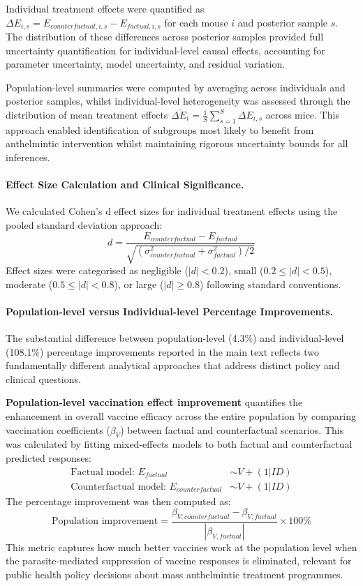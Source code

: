 \documentclass[a4paper, hidelinks, 11pt]{article}
\begin{document}
\begin{appendices}
	Individual treatment effects were quantified as $\Delta E_{i,s} = E_{counterfactual,i,s} - E_{factual,i,s}$ for each mouse $i$ and posterior sample $s$. The distribution of these differences across posterior samples provided full uncertainty quantification for individual-level causal effects, accounting for parameter uncertainty, model uncertainty, and residual variation.

	Population-level summaries were computed by averaging across individuals and posterior samples, whilst individual-level heterogeneity was assessed through the distribution of mean treatment effects $\bar{\Delta E_i} = \frac{1}{S}\sum_{s=1}^S \Delta E_{i,s}$ across mice. This approach enabled identification of subgroups most likely to benefit from anthelmintic intervention whilst maintaining rigorous uncertainty bounds for all inferences.

	\paragraph{Effect Size Calculation and Clinical Significance.} \label{supdata:EffectSizeCalculation} We calculated Cohen's d effect sizes for individual treatment effects using the pooled standard deviation approach:
	$$d = \frac{E_{counterfactual} - E_{factual}}{\sqrt{(\sigma_{counterfactual}^2 + \sigma_{factual}^2)/2}}$$
	Effect sizes were categorised as negligible ($|d| < 0.2$), small ($0.2 \leq |d| < 0.5$), moderate ($0.5 \leq |d| < 0.8$), or large ($|d| \geq 0.8$) following standard conventions.

	\paragraph{Population-level versus Individual-level Percentage Improvements.} \label{supdata:PercentageImprovements} The substantial difference between population-level (4.3\%) and individual-level (108.1\%) percentage improvements reported in the main text reflects two fundamentally different analytical approaches that address distinct policy and clinical questions.

	\textbf{Population-level vaccination effect improvement} quantifies the enhancement in overall vaccine efficacy across the entire population by comparing vaccination coefficients ($\beta_V$) between factual and counterfactual scenarios. This was calculated by fitting mixed-effects models to both factual and counterfactual predicted responses:
	\begin{align}
		\text{Factual model: } E_{factual}               & \sim V + (1|ID) \\
		\text{Counterfactual model: } E_{counterfactual} & \sim V + (1|ID)
	\end{align}
	The percentage improvement was then computed as:
	$$\text{Population improvement} = \frac{\beta_{V,counterfactual} - \beta_{V,factual}}{|\beta_{V,factual}|} \times 100\%$$
	This metric captures how much better vaccines work at the population level when the parasite-mediated suppression of vaccine responses is eliminated, relevant for public health policy decisions about mass anthelmintic treatment programmes.


\end{appendices}
\end{document}
